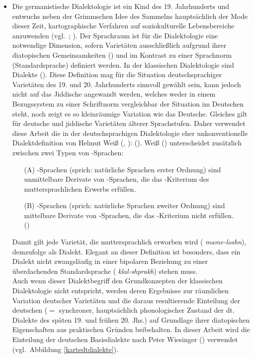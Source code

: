 \begin{itemize}
\largerpage
\item Die germanistische Dialektologie ist ein Kind des 19. Jahrhunderts und entwuchs neben der Grimmschen Idee des Sammelns hauptsächlich der Mode dieser Zeit, kartographische Verfahren auf soziokulturelle Lebensbereiche anzuwenden (vgl.\, \citealt[89–107]{SchmidtHerrgen2011}; \citealt{Schneider2004}). Der Sprachraum ist für die Dialektologie eine notwendige Dimension, sofern Varietäten ausschließlich aufgrund ihrer diatopischen Gemeinsamkeiten () und im Kontrast zu einer Sprachnorm (Standardsprache) definiert werden. In der klassischen Dialektologie  sind Dialekte  (\citealt[57]{SchmidtHerrgen2011}).
Diese Definition mag für die Situation deutschsprachiger Varietäten des 19. und 20. Jahrhunderts sinnvoll gewählt sein, kann jedoch nicht auf das Jiddische angewandt werden, welches weder in einem Bezugssystem zu einer Schriftnorm vergleichbar der Situation im Deutschen steht, noch zeigt es so kleinräumige Variation wie das Deutsche. Gleiches gilt für deutsche und jiddische Varietäten älterer Sprachstufen. Daher verwendet diese Arbeit die in der deutschsprachigen Dialektologie eher unkonventionelle Dialektdefinition von Helmut Weiß (\citeyear[1--15]{Weiss1998}, \citeyear{Weiss2009}):  (\citealt[257]{Weiss2009}). Weiß (\citeyear{Weiss1998}) unterscheidet zusätzlich zwischen zwei Typen von -Sprachen: 
\begin{itemize}
\item [(A)] -Sprachen (sprich: natürliche Sprachen erster Ordnung) sind unmittelbare Derivate von -Sprachen, die das -Kriterium des muttersprachlichen Erwerbs erfüllen.
\item [(B)] -Sprachen (sprich: natürliche Sprachen zweiter Ordnung) sind mittelbare Derivate von -Sprachen, die das -Kriterium nicht erfüllen.\\ 
(\citealt[3]{Weiss1998})
\end{itemize}

Damit gilt jede Varietät, die muttersprachlich erworben wird ({\oj} \textit{mame-loshn}), demzufolge als Dialekt. Elegant an dieser Definition ist besonders, dass ein Dialekt  nicht zwangsläufig in einer bipolaren Beziehung zu einer überdachenden Standardsprache ({\oj} \textit{klal-shprakh}) stehen muss.\\
Auch wenn dieser Dialektbegriff den Grundkonzepten der klassischen Dialektologie nicht entspricht, werden deren Ergebnisse zur räumlichen Variation deutscher Varietäten 
und die daraus resultierende Einteilung der deutschen %
  ($=$ synchroner, 
hauptsächlich
phonologischer Zustand der dt.\, Dialekte des späten 19. und frühen 20. Jhs.) auf Grundlage ihrer diatopischen Eigenschaften aus praktischen Gründen beibehalten. In dieser Arbeit wird die Einteilung der deutschen Basisdialekte nach Peter Wiesinger (\citealt{Wiesinger1983a}) verwendet (vgl.\, Abbildung \ref{kartedtdialekte}). 



\end{itemize}

